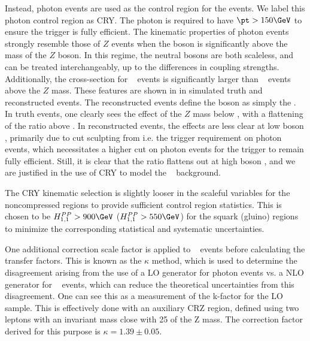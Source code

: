 Instead, photon events are used as the control region for the \Zvv events.
We label this photon control region as CRY.
The photon is required to have $\pt > 150 \GeV$ to ensure the trigger is fully efficient.
The kinematic properties of photon events strongly resemble those of $Z$ events when the boson \pt is significantly above the mass of the $Z$ boson.
In this regime, the neutral bosons are both scaleless, and can be treated interchangeably, up to the differences in coupling strengths.
Additionally, the cross-section for \gammajets~ events is significantly larger than \zjets~ events above the $Z$ mass.
These features are shown in  in simulated \Zvv truth and reconstructed events.
The reconstructed \Zvv events define the boson \pt as simply the \met.
In truth events, one clearly sees the effect of the $Z$ mass below  \GeV, with a flattening of the ratio above  \GeV.
In reconstructed events, the effects are less clear at low boson \pt, primarily due to cut sculpting from i.e. the trigger requirement on photon events, which necessitates a higher \pt cut on photon events for the trigger to remain fully efficient.
Still, it is clear that the ratio flattens out at high boson \pt, and we are justified in the use of CRY to model the \zjets~ background.

The CRY kinematic selection is slightly looser in the scaleful variables for the noncompressed regions to provide sufficient control region statistics.
This is chosen to be $\HFnm{PP}{1}{1} > 900 \GeV$ ($\HFnm{PP}{1}{1} > 550 \GeV$) for the squark (gluino) regions to minimize the corresponding statistical and systematic uncertainties.
\begin{figure}
\caption{} \label{fig:boson_pt_ratio}
\end{figure}

One additional correction scale factor is applied to \gammajets~ events before calculating the transfer factors.
This is known as the $\kappa$ method, which is used to determine the disagreement arising from the use of a LO generator for photon events vs. a NLO generator for \zjets~ events, which can reduce the theoretical uncertainties from this disagreement.
One can see this as a measurement of the k-factor for the LO \gammajets~ sample.
This is effectively done with an auxiliary CRZ region, defined using two leptons with an invariant mass close with 25 \GeV of the Z mass.
The correction factor derived for this purpose is $\kappa = 1.39 \pm 0.05$.

